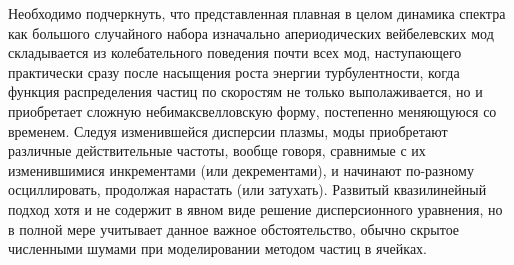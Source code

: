 Необходимо подчеркнуть, что представленная плавная в целом динамика спектра как большого случайного набора изначально апериодических вейбелевских мод складывается из колебательного поведения почти всех мод, наступающего практически сразу после насыщения роста энергии турбулентности, когда функция распределения частиц по скоростям не только выполаживается, но и приобретает сложную небимаксвелловскую форму, постепенно меняющуюся со временем. 
Следуя изменившейся дисперсии плазмы, моды приобретают различные действительные частоты, вообще говоря, сравнимые с их изменившимися инкрементами (или декрементами), и начинают по-разному осциллировать, продолжая нарастать (или затухать). 
Развитый квазилинейный подход хотя и не содержит в явном виде решение дисперсионного уравнения, но в полной мере учитывает данное важное обстоятельство, обычно скрытое численными шумами при моделировании методом частиц в ячейках. 

